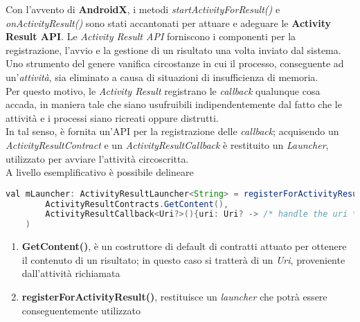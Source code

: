 \documentclass{article}
\begin{document}
Con l'avvento di \textbf{AndroidX}, i metodi \textit{startActivityForResult()} e \textit{onActivityResult()} sono stati accantonati per attuare e adeguare le \textbf{Activity Result API}. Le \textit{Activity Result API} forniscono i componenti per la registrazione, l'avvio e la gestione di un risultato una volta inviato dal sistema. Uno strumento del genere vanifica circostanze in cui il processo, conseguente ad un'\textit{attività}, sia eliminato a causa di situazioni di insufficienza di memoria.\vspace*{7pt}\\
Per questo motivo, le \textit{Activity Result} registrano le \textit{callback} qualunque cosa accada, in maniera tale che siano usufruibili indipendentemente dal fatto che le attività e i processi siano ricreati oppure distrutti.\vspace*{7pt}\\
In tal senso, è fornita un'API per la registrazione delle \textit{callback}; acquisendo un \textit{ActivityResultContract} e un \textit{ActivityResultCallback} è restituito un \textit{Launcher}, utilizzato per avviare l'attività circoscritta.\vspace*{7pt}\\
A livello esemplificativo è possibile delineare
\begin{lstlisting}[language=JAVA, title=Istanza di un launcher per le activities]
val mLauncher: ActivityResultLauncher<String> = registerForActivityResult(
        ActivityResultContracts.GetContent(),
        ActivityResultCallback<Uri?>(){uri: Uri? -> /* handle the uri */}
    )
\end{lstlisting}
\begin{enumerate}
    \itemsep0em
    \renewcommand{\labelenumi}{ } 
    \item \textbf{GetContent()}, è un costruttore di default di contratti attuato per ottenere il contenuto di un risultato; in questo caso si tratterà di un \textit{Uri}, proveniente dall'attività richiamata
    \item \textbf{registerForActivityResult()}, restituisce un \textit{launcher} che potrà essere conseguentemente utilizzato
\end{enumerate}
\end{document}
